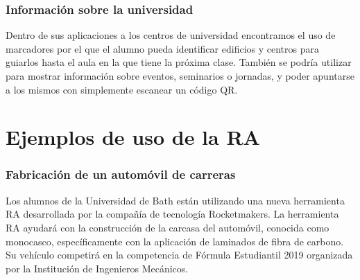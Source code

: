     
\subsubsection{Información sobre la universidad}  

Dentro de sus aplicaciones a los centros de universidad encontramos el uso de marcadores por el que el alumno pueda identificar edificios y centros para guiarlos hasta el aula en la que tiene la próxima clase. También se podría utilizar para mostrar información sobre eventos, seminarios o jornadas, y poder apuntarse a los mismos con simplemente escanear un código QR.



\section{Ejemplos de uso de la RA}


\subsubsection{Fabricación de un automóvil de carreras} 

Los alumnos de la Universidad de Bath están utilizando una nueva herramienta RA desarrollada por la compañía de tecnología Rocketmakers. La herramienta RA ayudará con la construcción de la carcasa del automóvil, conocida como monocasco, específicamente con la aplicación de laminados de fibra de carbono. Su vehículo competirá en la competencia de Fórmula Estudiantil 2019 organizada por la Institución de Ingenieros Mecánicos.

